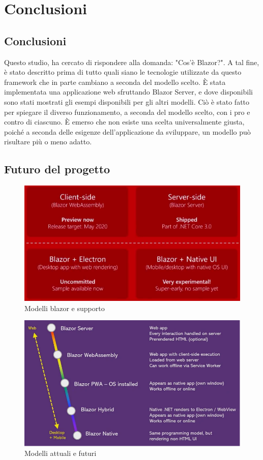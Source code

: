 \chapter{Conclusioni}\label{cap:conclusioni}
\section{Conclusioni}\label{sez:conclusioni}
Questo studio, ha cercato di rispondere alla domanda: "Cos'\`e Blazor?".
A tal fine, \`e stato descritto prima di tutto quali siano le tecnologie utilizzate da questo framework che in parte cambiano a seconda del modello scelto.
\`E stata implementata una applicazione web sfruttando Blazor Server, e dove disponibili sono stati mostrati gli esempi disponibili per gli altri modelli.
Ci\`o \`e stato fatto per spiegare il diverso funzionamento, a seconda del modello scelto, con i pro e contro di ciascuno.
\`E emerso che non esiste una scelta universalmente giusta, poich\'e a seconda delle esigenze dell'applicazione da sviluppare, un modello pu\`o risultare pi\`u o meno adatto.

\section{Futuro del progetto}\label{sez:futuro}
\begin{figure}[H]
	\centerline{\includegraphics[scale=0.8]{figure/ModelsSupportedOrNot.png}}
	\caption{Modelli blazor e supporto}
	\label{fig:supportedBlazorModels}
\end{figure}

\begin{figure}[H]
	\centerline{\includegraphics[scale=0.6]{figure/BlazorModels.PNG}}
	\caption{Modelli attuali e futuri}
	\label{fig:blazorModels}
\end{figure}

